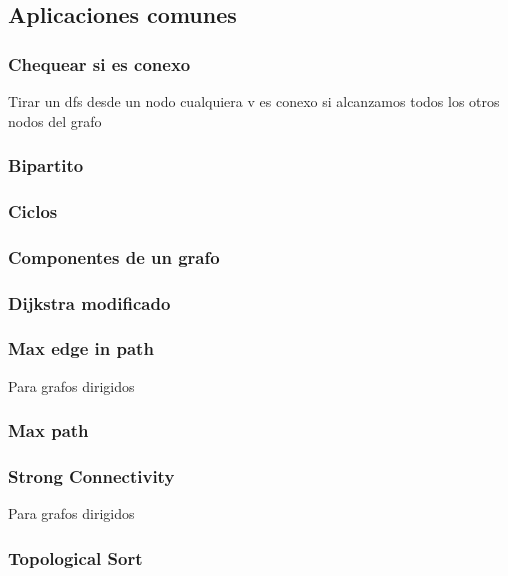 \newpage
\subsection{Aplicaciones comunes}

\subsubsection{Chequear si es conexo}
Tirar un dfs desde un nodo cualquiera v
es conexo si alcanzamos todos los otros nodos del grafo

\subsubsection{Bipartito}


\subsubsection{Ciclos}


\subsubsection{Componentes de un grafo}


\subsubsection{Dijkstra modificado}


\subsubsection{Max edge in path}
Para grafos dirigidos


\subsubsection{Max path}


\subsubsection{Strong Connectivity}
Para grafos dirigidos


\subsubsection{Topological Sort}


\newpage
